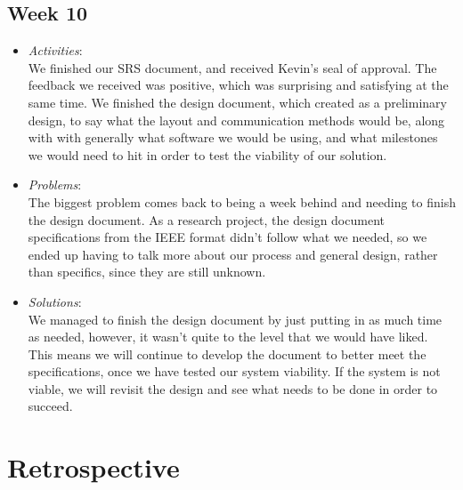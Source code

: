 \documentclass[compsoc,draftclsnofoot,onecolumn,10pt]{IEEEtran}
\begin{document}
\subsection{Week 10}
	\begin{itemize}
        \item \textit{Activities}:\\
        We finished our SRS document, and received Kevin's seal of approval. 
        The feedback we received was positive, which was surprising and satisfying at the same time. 
        We finished the design document, which created as a preliminary design, to say what the layout and communication methods would be, along with with generally what software we would be using, and what milestones we would need to hit in order to test the viability of our solution. 
        
        \item \textit{Problems}:\\
        The biggest problem comes back to being a week behind and needing to finish the design document. 
        As a research project, the design document specifications from the IEEE format didn't follow what we needed, so we ended up having to talk more about our process and general design, rather than specifics, since they are still unknown. 
        
        \item \textit{Solutions}:\\
       	We managed to finish the design document by just putting in as much time as needed, however, it wasn't quite to the level that we would have liked. 
	This means we will continue to develop the document to better meet the specifications, once we have tested our system viability. 
	If the system is not viable, we will revisit the design and see what needs to be done in order to succeed. 
	\end{itemize}
   
\section{Retrospective}

    
\end{document}
